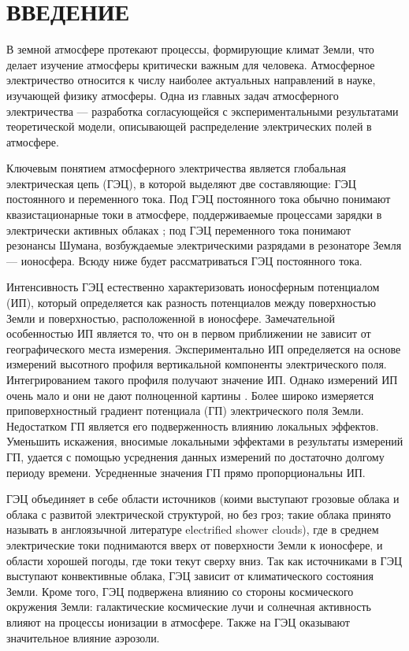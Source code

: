 \section*{ВВЕДЕНИЕ}

В земной атмосфере протекают процессы, формирующие климат Земли, что делает изучение атмосферы критически важным для человека. Атмосферное электричество относится к числу наиболее актуальных направлений в науке, изучающей физику атмосферы. Одна из главных задач атмосферного электричества --- разработка согласующейся с экспериментальными результатами теоретической модели, описывающей распределение электрических полей в атмосфере.

Ключевым понятием атмосферного электричества является глобальная электрическая цепь (ГЭЦ), в которой выделяют две составляющие: ГЭЦ постоянного и переменного тока. Под ГЭЦ постоянного тока обычно понимают квазистационарные токи в атмосфере, поддерживаемые процессами зарядки в электрически активных облаках \cite{Williams_Mareev_2014, Rycroft_et_al_2008, Williams_2009}; под ГЭЦ переменного тока понимают резонансы Шумана, возбуждаемые электрическими разрядами в резонаторе Земля --- ионосфера. Всюду ниже будет рассматриваться ГЭЦ постоянного тока.

Интенсивность ГЭЦ естественно характеризовать ионосферным потенциалом (ИП), который определяется как разность потенциалов между поверхностью Земли и поверхностью, расположенной в ионосфере. Замечательной особенностью ИП является то, что он в первом приближении не зависит от географического места измерения. Экспериментально ИП определяется на основе измерений высотного профиля вертикальной компоненты электрического поля. Интегрированием такого профиля получают значение ИП. Однако измерений ИП очень мало и они не дают полноценной картины \cite{Markson_2007}. Более широко измеряется приповерхностный градиент потенциала (ГП) электрического поля Земли. Недостатком ГП является его подверженность влиянию локальных эффектов. Уменьшить искажения, вносимые локальными эффектами в результаты измерений ГП, удается с помощью усреднения данных измерений по достаточно долгому периоду времени. Усредненные значения ГП прямо пропорциональны ИП.

ГЭЦ объединяет в себе области источников (коими выступают грозовые облака и облака с развитой электрической структурой, но без гроз; такие облака принято называть в англоязычной литературе electrified shower clouds), где в среднем электрические токи поднимаются вверх от поверхности Земли к ионосфере, и области хорошей погоды, где токи текут сверху вниз. Так как источниками в ГЭЦ выступают конвективные облака, ГЭЦ зависит от климатического состояния Земли. Кроме того, ГЭЦ подвержена влиянию со стороны космического окружения Земли: галактические космические лучи и солнечная активность влияют на процессы ионизации в атмосфере. Также на ГЭЦ оказывают значительное влияние аэрозоли.

